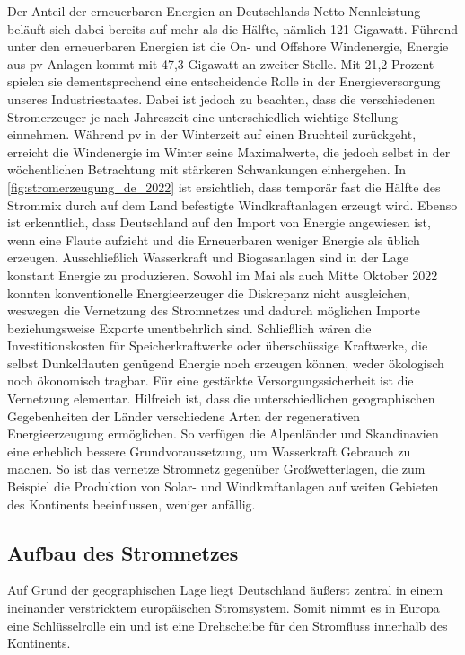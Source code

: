 \documentclass[12pt, a4paper]{article}
\begin{document}
Der Anteil der erneuerbaren Energien an Deutschlands Netto-Nennleistung beläuft sich dabei bereits auf mehr als die Hälfte, nämlich 121 Gigawatt. Führend unter den erneuerbaren Energien ist die On- und Offshore Windenergie, Energie aus \ac{pv}-Anlagen kommt mit 47,3 Gigawatt an zweiter Stelle. Mit 21,2 Prozent spielen sie dementsprechend eine entscheidende Rolle in der Energieversorgung unseres Industriestaates. Dabei ist jedoch zu beachten, dass die verschiedenen Stromerzeuger je nach Jahreszeit eine unterschiedlich wichtige Stellung einnehmen. Während \ac{pv} in der Winterzeit auf einen Bruchteil zurückgeht, erreicht die Windenergie im Winter seine Maximalwerte, die jedoch selbst in der wöchentlichen Betrachtung mit stärkeren Schwankungen einhergehen. In \autoref{fig:stromerzeugung_de_2022} ist ersichtlich, dass temporär fast die Hälfte des Strommix durch auf dem Land befestigte Windkraftanlagen erzeugt wird. Ebenso ist erkenntlich, dass Deutschland auf den Import von Energie angewiesen ist, wenn eine Flaute aufzieht und die Erneuerbaren weniger Energie als üblich erzeugen. Ausschließlich Wasserkraft und Biogasanlagen sind in der Lage konstant Energie zu produzieren. Sowohl im Mai als auch Mitte Oktober 2022 konnten konventionelle Energieerzeuger die Diskrepanz nicht ausgleichen, weswegen die Vernetzung des Stromnetzes und dadurch möglichen Importe beziehungsweise Exporte unentbehrlich sind. Schließlich wären die Investitionskosten für Speicherkraftwerke oder überschüssige Kraftwerke, die selbst Dunkelflauten genügend Energie noch erzeugen können, weder ökologisch noch ökonomisch tragbar. Für eine gestärkte Versorgungssicherheit ist die Vernetzung elementar. Hilfreich ist, dass die unterschiedlichen geographischen Gegebenheiten der Länder verschiedene Arten der regenerativen Energieerzeugung ermöglichen. So verfügen die Alpenländer und Skandinavien eine erheblich bessere Grundvoraussetzung, um Wasserkraft Gebrauch zu machen. So ist das vernetze Stromnetz gegenüber Großwetterlagen, die zum Beispiel die Produktion von Solar- und Windkraftanlagen auf weiten Gebieten des Kontinents beeinflussen, weniger anfällig.


\subsection{Aufbau des Stromnetzes}

Auf Grund der geographischen Lage liegt Deutschland äußerst zentral in einem ineinander verstricktem europäischen Stromsystem. Somit nimmt es in Europa eine Schlüsselrolle ein und ist eine Drehscheibe für den Stromfluss innerhalb des Kontinents.
\end{document}
